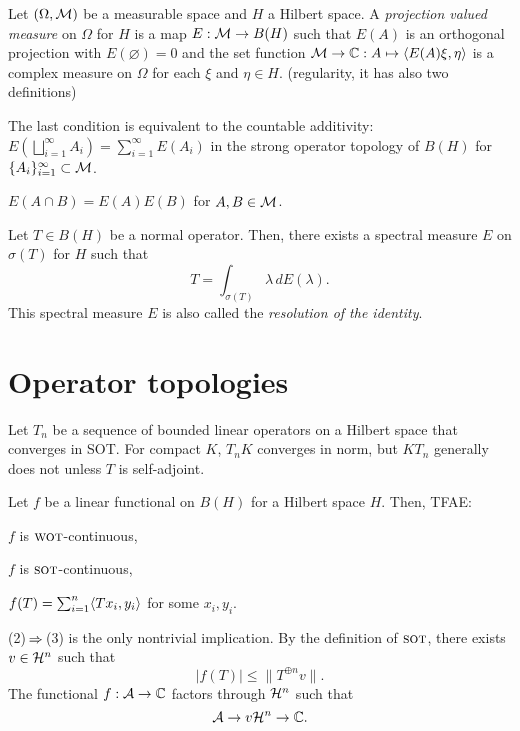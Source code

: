 \documentclass{../note}
\newcommand{\wot}{{\text{\sc wot}}}
\newcommand{\sot}{{\text{\sc sot}}}
\begin{document}
\begin{prb}
Let $(\Omega,\mathcal{M})$ be a measurable space and $H$ a Hilbert space.
A \emph{projection valued measure} on $\Omega$ for $H$ is a map $E:\mathcal{M}\to B(H)$ such that $E(A)$ is an orthogonal projection with $E(\varnothing)=0$ and the set function $\mathcal{M}\to\mathbb{C}:A\mapsto\langle E(A)\xi,\eta\rangle$ is a complex measure on $\Omega$ for each $\xi$ and $\eta\in H$.
(regularity, it has also two definitions)
\begin{parts}
\item The last condition is equivalent to the countable additivity: $E(\bigsqcup_{i=1}^\infty A_i)=\sum_{i=1}^\infty E(A_i)$ in the strong operator topology of $B(H)$ for $\{A_i\}_{i=1}^\infty\subset\mathcal{M}$.
\item $E(A\cap B)=E(A)E(B)$ for $A,B\in\mathcal{M}$.
\end{parts}
\end{prb}


Let $T\in B(H)$ be a normal operator.
Then, there exists a spectral measure $E$ on $\sigma(T)$ for $H$ such that
\[T=\int_{\sigma(T)}\lambda\,dE(\lambda).\]
This spectral measure $E$ is also called the \emph{resolution of the identity}.




\section{Operator topologies}


\begin{prb}
Let $T_n$ be a sequence of bounded linear operators on a Hilbert space that converges in SOT.
For compact $K$, $T_n K$ converges in norm, but $KT_n$ generally does not unless $T$ is self-adjoint.
\end{prb}

\begin{prb}
Let $f$ be a linear functional on $B(H)$ for a Hilbert space $H$.
Then, TFAE:
\begin{parts}
\item $f$ is $\wot$-continuous,
\item $f$ is $\sot$-continuous,
\item $f(T)=\sum_{i=1}^n\langle Tx_i,y_i\rangle$ for some $x_i,y_i$.
\end{parts}
\end{prb}
\begin{pf}
(2)$\impl$(3) is the only nontrivial implication.
By the definition of $\sot$, there exists $v\in \mathcal{H}^n$ such that
\[|f(T)|\le\|T^{\oplus n}v\|.\]
The functional $f:\mathcal{A}\to\mathbb{C}$ factors through $\mathcal{H}^n$ such that
\[\mathcal{A}\to{v}\mathcal{H}^n\to\mathbb{C}.\]
\end{pf}
\end{document}
